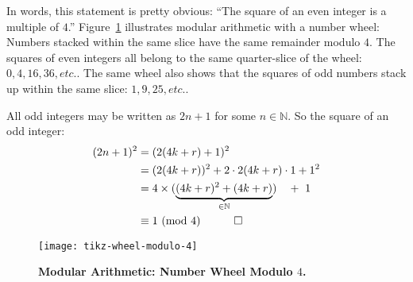 \documentclass[12pt]{article}
\newcommand{\modulo}[1]{~(\mathrm{mod}~#1)}
\begin{document}
In words, this statement is pretty obvious: ``The square of an even integer is a multiple of $4$.'' Figure~\ref{fig:modulo:wheel} illustrates modular arithmetic with a number wheel: Numbers stacked within the same slice have the same remainder modulo $4$. The squares of even integers all belong to the same quarter-slice of the wheel: $0,4,16,36,etc.$. The same wheel also shows that the squares of odd numbers stack up within the same slice: $1,9,25,etc.$.


All odd integers may be written as $2n+1$ for some $n\in\mathbb{N}$. So the square of an odd integer:
\begin{align*}
(2n+1)^{2} 
  & = (2(4k + r)+1)^{2} \\
  & = (2(4k + r))^{2} + 2\cdot2(4k + r)\cdot1 +1^{2} \\
  & = 4 \times (\underbrace{(4k + r)^{2}+(4k + r)}_{\in\mathbb{N}}) \quad +~ 1 \\
  & \equiv 1\modulo{4} \quad \qed
\end{align*}

\begin{figure}[htbp]
\centering
\texttt{[image: tikz-wheel-modulo-4]}
\caption{\textbf{Modular Arithmetic: Number Wheel Modulo $4$.}
\label{fig:modulo:wheel}}
\end{figure}
\end{document}
